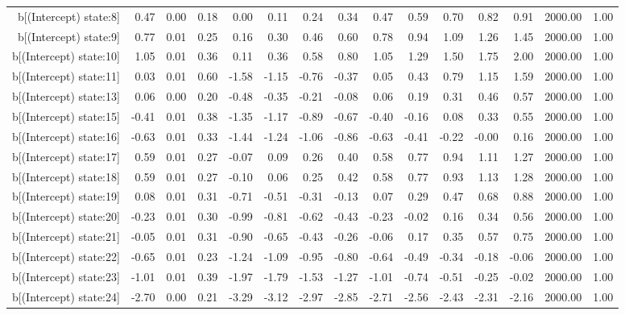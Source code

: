 \begin{table}[ht]
\begin{tabular}{rrrrrrrrrrrrrrr}
  b[(Intercept) state:8] & 0.47 & 0.00 & 0.18 & 0.00 & 0.11 & 0.24 & 0.34 & 0.47 & 0.59 & 0.70 & 0.82 & 0.91 & 2000.00 & 1.00 \\ 
  b[(Intercept) state:9] & 0.77 & 0.01 & 0.25 & 0.16 & 0.30 & 0.46 & 0.60 & 0.78 & 0.94 & 1.09 & 1.26 & 1.45 & 2000.00 & 1.00 \\ 
  b[(Intercept) state:10] & 1.05 & 0.01 & 0.36 & 0.11 & 0.36 & 0.58 & 0.80 & 1.05 & 1.29 & 1.50 & 1.75 & 2.00 & 2000.00 & 1.00 \\ 
  b[(Intercept) state:11] & 0.03 & 0.01 & 0.60 & -1.58 & -1.15 & -0.76 & -0.37 & 0.05 & 0.43 & 0.79 & 1.15 & 1.59 & 2000.00 & 1.00 \\ 
  b[(Intercept) state:13] & 0.06 & 0.00 & 0.20 & -0.48 & -0.35 & -0.21 & -0.08 & 0.06 & 0.19 & 0.31 & 0.46 & 0.57 & 2000.00 & 1.00 \\ 
  b[(Intercept) state:15] & -0.41 & 0.01 & 0.38 & -1.35 & -1.17 & -0.89 & -0.67 & -0.40 & -0.16 & 0.08 & 0.33 & 0.55 & 2000.00 & 1.00 \\ 
  b[(Intercept) state:16] & -0.63 & 0.01 & 0.33 & -1.44 & -1.24 & -1.06 & -0.86 & -0.63 & -0.41 & -0.22 & -0.00 & 0.16 & 2000.00 & 1.00 \\ 
  b[(Intercept) state:17] & 0.59 & 0.01 & 0.27 & -0.07 & 0.09 & 0.26 & 0.40 & 0.58 & 0.77 & 0.94 & 1.11 & 1.27 & 2000.00 & 1.00 \\ 
  b[(Intercept) state:18] & 0.59 & 0.01 & 0.27 & -0.10 & 0.06 & 0.25 & 0.42 & 0.58 & 0.77 & 0.93 & 1.13 & 1.28 & 2000.00 & 1.00 \\ 
  b[(Intercept) state:19] & 0.08 & 0.01 & 0.31 & -0.71 & -0.51 & -0.31 & -0.13 & 0.07 & 0.29 & 0.47 & 0.68 & 0.88 & 2000.00 & 1.00 \\ 
  b[(Intercept) state:20] & -0.23 & 0.01 & 0.30 & -0.99 & -0.81 & -0.62 & -0.43 & -0.23 & -0.02 & 0.16 & 0.34 & 0.56 & 2000.00 & 1.00 \\ 
  b[(Intercept) state:21] & -0.05 & 0.01 & 0.31 & -0.90 & -0.65 & -0.43 & -0.26 & -0.06 & 0.17 & 0.35 & 0.57 & 0.75 & 2000.00 & 1.00 \\ 
  b[(Intercept) state:22] & -0.65 & 0.01 & 0.23 & -1.24 & -1.09 & -0.95 & -0.80 & -0.64 & -0.49 & -0.34 & -0.18 & -0.06 & 2000.00 & 1.00 \\ 
  b[(Intercept) state:23] & -1.01 & 0.01 & 0.39 & -1.97 & -1.79 & -1.53 & -1.27 & -1.01 & -0.74 & -0.51 & -0.25 & -0.02 & 2000.00 & 1.00 \\ 
  b[(Intercept) state:24] & -2.70 & 0.00 & 0.21 & -3.29 & -3.12 & -2.97 & -2.85 & -2.71 & -2.56 & -2.43 & -2.31 & -2.16 & 2000.00 & 1.00 \\ 

\end{tabular}
\end{table}
